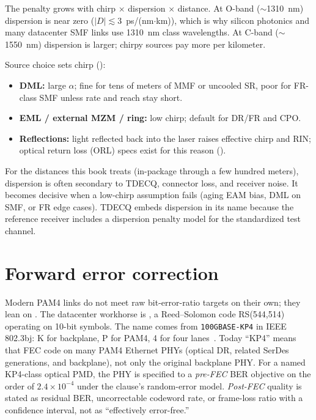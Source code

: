 The penalty grows with chirp $\times$ dispersion $\times$ distance. At O-band
($\sim$1310~nm) dispersion is near zero ($|D|\lesssim 3$~ps/(nm$\cdot$km)), which is why
silicon photonics and many datacenter SMF links use 1310~nm class wavelengths. At
C-band ($\sim$1550~nm) dispersion is larger; chirpy sources pay more per kilometer.

Source choice sets chirp ():

\begin{itemize}
\item \textbf{DML:} large $\alpha$; fine for tens of meters of MMF or uncooled SR,
      poor for FR-class SMF unless rate and reach stay short.
\item \textbf{EML / external MZM / ring:} low chirp; default for DR/FR and CPO.
\item \textbf{Reflections:} light reflected back into the laser raises effective
      chirp and RIN; optical return loss (ORL) specs exist for this reason
      ().
\end{itemize}

For the distances this book treats (in-package through a few hundred meters), dispersion
is often secondary to TDECQ, connector loss, and receiver noise. It becomes decisive
when a low-chirp assumption fails (aging EAM bias, DML on SMF, or FR edge cases).
TDECQ embeds dispersion in its name because the reference receiver includes a
dispersion penalty model for the standardized test channel.

\section{Forward error correction}
\label{sec:kp4}

Modern PAM4 links do not meet raw bit-error-ratio targets on their own; they lean
on . The datacenter workhorse is , a Reed--Solomon code
RS(544,514) operating on 10-bit symbols. The name comes from
\texttt{100GBASE-KP4} in IEEE 802.3bj: K for backplane, P for PAM4, 4 for four
lanes~\cite{ieee8023bj}. Today ``KP4'' means that FEC code on many
PAM4 Ethernet PHYs (optical DR, related SerDes generations, and backplane), not
only the original backplane PHY. For a named KP4-class optical PMD, the PHY is
specified to a \emph{pre-FEC} BER objective on the order of
$2.4\times10^{-4}$ under the clause's random-error model. \emph{Post-FEC}
 quality is stated as residual BER, uncorrectable codeword
rate, or frame-loss ratio with a confidence interval, not as ``effectively
error-free.''

